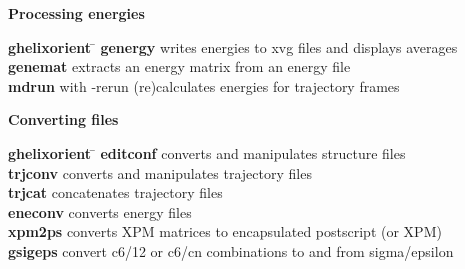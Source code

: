 \begin{description}
\item {\large\bf Processing energies}
\vspace{-2ex}\begin{tabbing}
{\bf g\us{}helixorient} \= \kill
{\bf g\us{}energy} \> writes energies to xvg files and displays averages \\
{\bf g\us{}enemat} \> extracts an energy matrix from an energy file \\
{\bf mdrun} \> with -rerun (re)calculates energies for trajectory frames \\
\end{tabbing}\vspace{-2ex}

\item {\large\bf Converting files}
\vspace{-2ex}\begin{tabbing}
{\bf g\us{}helixorient} \= \kill
{\bf editconf} \> converts and manipulates structure files \\
{\bf trjconv} \> converts and manipulates trajectory files \\
{\bf trjcat} \> concatenates trajectory files \\
{\bf eneconv} \> converts energy files \\
{\bf xpm2ps} \> converts XPM matrices to encapsulated postscript (or XPM) \\
{\bf g\us{}sigeps} \> convert c6/12 or c6/cn combinations to and from sigma/epsilon \\
\end{tabbing}\vspace{-2ex}


\end{description}

